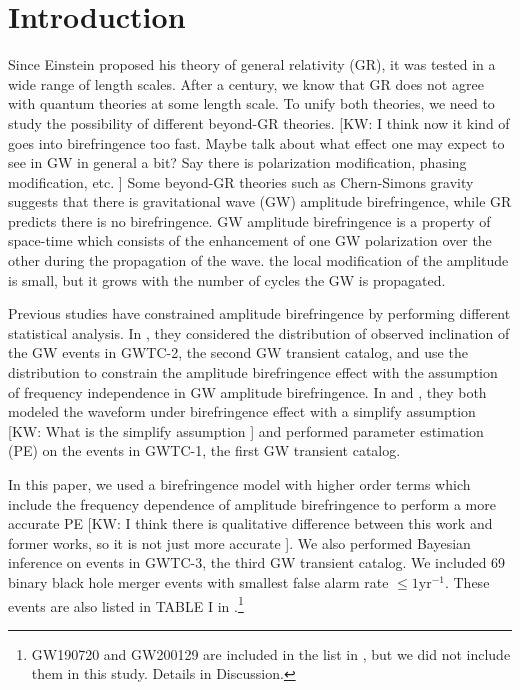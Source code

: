 \documentclass[aps,prd,twocolumn,superscriptaddress,preprintnumbers,floatfix,nofootinbib]{revtex4-2}
\newcommand{\kw}[1]{{\color{rb4}[KW: #1 ]}}
\begin{document}
\section{Introduction}
\label{sec:Introduction}
Since Einstein proposed his theory of general relativity (GR), it was tested in
a wide range of length scales. After a century, we know that GR does not agree
with quantum theories at some length scale. To unify both theories, we need to
study the possibility of different beyond-GR theories. \kw{I think now it kind
of goes into birefringence too fast. Maybe talk about what effect one may expect
to see in GW in general a bit? Say there is polarization modification, phasing
modification, etc.} Some beyond-GR theories such as Chern-Simons gravity
suggests that there is gravitational wave (GW) amplitude birefringence, while GR
predicts there is no birefringence. GW amplitude birefringence is a property of
space-time which consists of the enhancement of one GW polarization over the
other during the propagation of the wave. the local modification of the
amplitude is small, but it grows with the number of cycles the GW is propagated.


Previous studies have constrained amplitude birefringence by performing different statistical analysis.
In \citet{Okounkova_2022}, they considered the distribution of observed inclination of the GW events in GWTC-2,
the second GW transient catalog, and use the distribution to constrain the
amplitude birefringence effect with the assumption of frequency independence in
GW amplitude birefringence. In \citet{Yamada_2020} and \citet{Wang_2021}, they
both modeled the waveform under birefringence effect with a simplify assumption
\kw{What is the simplify assumption} and performed parameter estimation (PE) on the
events in GWTC-1, the first GW transient catalog.

In this paper, we used a birefringence model with higher order terms which
include the frequency dependence of amplitude birefringence to perform a more
accurate PE \kw{I think there is qualitative difference
between this work and former works, so it is not just more accurate}. We also
performed Bayesian inference on events in GWTC-3, the third GW transient
catalog. We included 69 binary black hole merger events with smallest false
alarm rate $\leq1\mathrm{yr^{-1}}$. These events are also listed in TABLE I in
\citet{GWTC_3_population}.\footnote{GW190720 and GW200129 are included in the
list in \citet{GWTC_3_population}, but we did not include them in this study.
Details in Discussion.}
\end{document}
